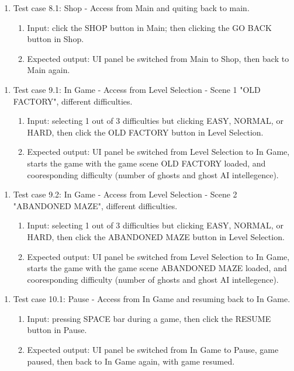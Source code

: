 \documentclass[11pt]{article}
\begin{document}
    \begin{enumerate}
        \item Test case 8.1: Shop - Access from Main and quiting back to main.
        \begin{enumerate}
            \item  Input: click the SHOP button in Main; then clicking the GO BACK button in Shop.
            \item  Expected output: UI panel be switched from Main to Shop, then back to Main again.
        \end{enumerate}
    \end{enumerate}
    \begin{enumerate}
        \item Test case 9.1: In Game - Access from Level Selection - Scene 1 "OLD FACTORY", different difficulties.
        \begin{enumerate}
            \item  Input: selecting 1 out of 3 difficulties but clicking EASY, NORMAL, or HARD, then click the OLD FACTORY button in Level Selection.
            \item  Expected output: UI panel be switched from Level Selection to In Game, starts the game with the game scene OLD FACTORY loaded, and cooresponding difficulty (number of ghosts and ghost AI intellegence).
        \end{enumerate}
    \end{enumerate}
    \begin{enumerate}
        \item Test case 9.2: In Game - Access from Level Selection - Scene 2 "ABANDONED MAZE", different difficulties.
        \begin{enumerate}
            \item  Input: selecting 1 out of 3 difficulties but clicking EASY, NORMAL, or HARD, then click the ABANDONED MAZE button in Level Selection.
            \item  Expected output: UI panel be switched from Level Selection to In Game, starts the game with the game scene ABANDONED MAZE loaded, and cooresponding difficulty (number of ghosts and ghost AI intellegence).
        \end{enumerate}
    \end{enumerate}
    \begin{enumerate}
        \item Test case 10.1: Pause - Access from In Game and resuming back to In Game.
        \begin{enumerate}
            \item  Input: pressing SPACE bar during a game, then click the RESUME button in Pause.
            \item  Expected output: UI panel be switched from In Game to Pause, game paused, then back to In Game again, with game resumed.
        \end{enumerate}
    \end{enumerate}
\end{document}
